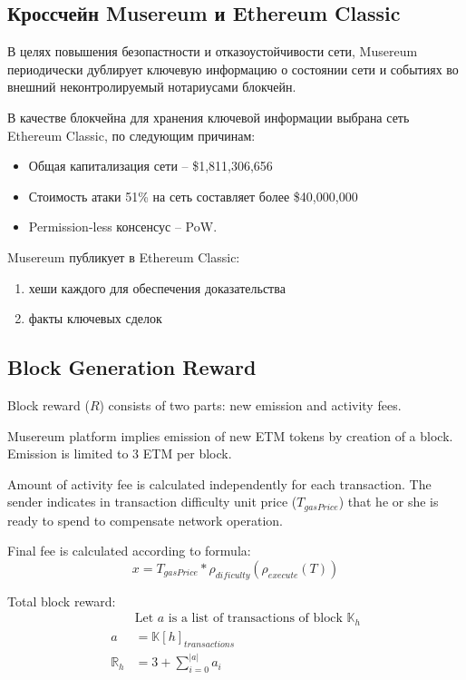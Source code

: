 \documentclass[12pt]{report}
\begin{document}
\subsection{Кроссчейн Musereum и Ethereum Classic}
\label{tech-blockchain-anchoring}
\begin{multicols}{2}
В целях повышения безопастности и отказоустойчивости сети, Musereum периодически дублирует ключевую информацию о состоянии сети и событиях во внешний неконтролируемый нотариусами блокчейн. 

В качестве блокчейна для хранения ключевой информации выбрана сеть Ethereum Classic, по следующим причинам:
\begin{itemize}
	\item Общая капитализация сети – \$1,811,306,656
	\item Стоимость атаки 51\% на сеть составляет более \$40,000,000
	\item Permission-less консенсус – PoW.
\end{itemize}

Musereum публикует в Ethereum Classic:
\begin{enumerate}
	\item хеши каждого для обеспечения доказательства
	\item факты ключевых сделок
\end{enumerate}
\end{multicols}

\vfill\null\pagebreak

\subsection{Block Generation Reward}
\label{tech-blockchain-reward}
\begin{multicols}{2}
Block reward ($R$) consists of two parts: new emission and activity fees.

Musereum platform implies emission of new ETM tokens by creation of a block. Emission is limited to 3 ETM per block.

Amount of activity fee is calculated independently for each transaction. The sender indicates in transaction difficulty unit price ($T_{gasPrice}$) that he or she is ready to spend to compensate network operation.

Final 	fee is calculated according to formula:
\begin{equation}
x = T_{gasPrice} * \rho_{dificulty}(\rho_{execute}(T))
\end{equation}

Total block reward:
\begin{align}
&\text{Let } a \text{ is a list of transactions of block } \mathbb{K}_h \\
a &= \mathbb{K}[h]_{transactions} \\
\mathbb{R}_h &= 3 + \sum\limits_{i=0}^{|a|} a_i
\end{align}
\end{multicols}
\end{document}
